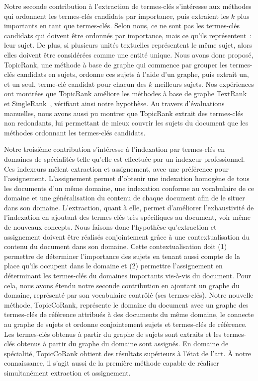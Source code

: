     Notre seconde contribution à l'extraction de termes-clés s'intéresse aux
    méthodes qui ordonnent les termes-clés candidats par importance, puis
    extraient les $k$ plus importants en tant que termes-clés. Selon nous, ce ne
    sont pas les termes-clés candidats qui doivent être ordonnés par importance,
    mais ce qu'ils représentent~: leur sujet. De plus, si plusieurs unités
    textuelles représentent le même sujet, alors elles doivent être considérées
    comme une entité unique. Nous avons donc proposé, TopicRank, une méthode à
    base de graphe qui commence par grouper les termes-clés candidats en sujets,
    ordonne ces sujets à l'aide d'un graphe, puis extrait un, et un seul,
    terme-clé candidat pour chacun des $k$ meilleurs sujets. Nos expériences
    ont montrées que TopicRank améliore les méthodes à base de graphe
    TextRank~\cite{mihalcea2004textrank} et SingleRank~\cite{wan2008expandrank},
    vérifiant ainsi notre hypothèse. Au travers d'évaluations manuelles, nous
    avons aussi pu montrer que TopicRank extrait des termes-clés non redondants,
    lui permettant de mieux couvrir les sujets du document que les méthodes
    ordonnant les termes-clés candidats.

    Notre troisième contribution s'intéresse à l'indexation par termes-clés en
    domaines de spécialités telle qu'elle est effectuée par un indexeur
    professionnel. Ces indexeurs mêlent extraction et assignement, avec une
    préférence pour l'assignement. L'assignement permet d'obtenir une indexation
    homogène de tous les documents d'un même domaine, une indexation conforme au
    vocabulaire de ce domaine et une généralisation du contenu de chaque
    document afin de le situer dans son domaine. L'extraction, quant à elle,
    permet d'améliorer l'exhaustivité de l'indexation en ajoutant des
    termes-clés très spécifiques au document, voir même de nouveaux concepts.
    Nous faisons donc l'hypothèse qu'extraction et assignement doivent être
    réalisés conjointement grâce à une contextualisation du contenu du
    document dans son domaine. Cette contextualisation doit (1) permettre de
    déterminer l'importance des sujets en tenant aussi compte de la place qu'ils
    occupent dans le domaine et (2) permettre l'assignement en déterminant les
    termes-clés du domaines importants vis-à-vis du document.
    Pour cela, nous avons étendu notre seconde contribution en ajoutant un
    graphe du domaine, représenté par son vocabulaire contrôlé (ses
    termes-clés). Notre nouvelle méthode, TopicCoRank, représente le domaine du
    document avec un graphe des termes-clés de référence attribués à des
    documents du même domaine, le connecte au graphe de sujets et ordonne
    conjointement sujets et termes-clés de référence. Les termes-clés obtenus à
    partir du graphe de sujets sont extraits et les termes-clés obtenus à partir
    du graphe du domaine sont assignés. En domaine de spécialité, TopicCoRank
    obtient des résultats supérieurs à l'état de l'art. À notre connaissance, il
    s'agit aussi de la première méthode capable de réaliser simultanément
    extraction et assignement.

